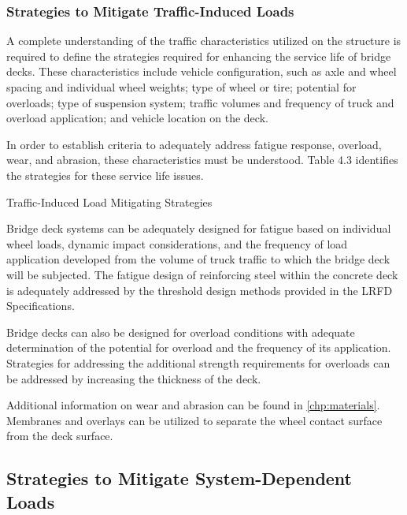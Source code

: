 \subsubsection*{Strategies to Mitigate Traffic-Induced Loads}
A complete understanding of the traffic characteristics utilized on the structure is required to define the strategies
required for enhancing the service life of bridge decks. These characteristics include vehicle configuration, such as
axle and wheel spacing and individual wheel weights; type of wheel or tire; potential for overloads; type of
suspension system; traffic volumes and frequency of truck and overload application; and vehicle location on the
deck.

In order to establish criteria to adequately address fatigue response, overload, wear, and abrasion, these
characteristics must be understood. Table 4.3 identifies the strategies for these service life issues.

\begin{table}
  \caption{Traffic-Induced Load Mitigating Strategies}
  \label{tab:traffic-induced-strategy}
\end{table}

Bridge deck systems can be adequately designed for fatigue based on individual wheel loads, dynamic impact
considerations, and the frequency of load application developed from the volume of truck traffic to which the bridge
deck will be subjected. The fatigue design of reinforcing steel within the concrete deck is adequately addressed by
the threshold design methods provided in the LRFD Specifications.

Bridge decks can also be designed for overload conditions with adequate determination of the potential for
overload and the frequency of its application. Strategies for addressing the additional strength requirements for
overloads can be addressed by increasing the thickness of the deck.

Additional information on wear and abrasion can be found in \cref{chp:materials}. Membranes and overlays can be utilized
to separate the wheel contact surface from the deck surface.

\subsection{Strategies to Mitigate System-Dependent Loads}
\label{subsec:strategies-mitigate-system-dependent}

